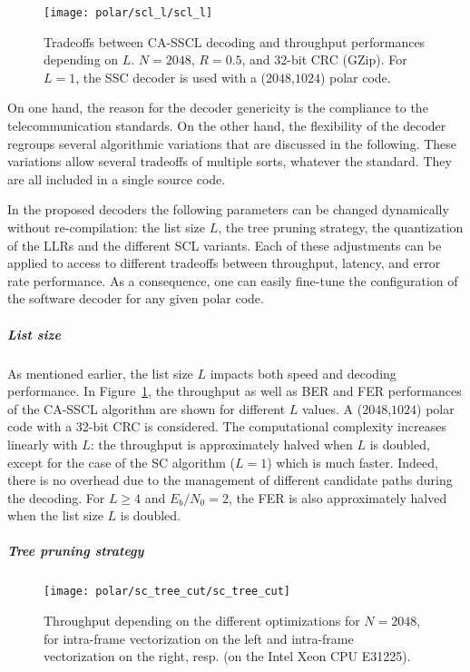 \begin{figure}
  \centering
  \texttt{[image: polar/scl\_l/scl\_l]}
  \caption{Tradeoffs between CA-SSCL decoding and throughput performances
    depending on $L$. $N=2048$, $R=0.5$, and 32-bit CRC (GZip). For $L=1$, the
    SSC decoder is used with a ($2048$,$1024$) polar code.}
  \label{plot:polar_scl_l}
\end{figure}

On one hand, the reason for the decoder genericity is the compliance to the
telecommunication standards. On the other hand, the flexibility of the decoder
regroups several algorithmic variations that are discussed in the following.
These variations allow several tradeoffs of multiple sorts, whatever the
standard. They are all included in a single source code.

In the proposed decoders the following parameters can be changed dynamically
without re-compilation: the list size $L$, the tree pruning strategy, the
quantization of the LLRs and the different SCL variants. Each of these
adjustments can be applied to access to different tradeoffs between throughput,
latency, and error rate performance. As a consequence, one can easily fine-tune
the configuration of the software decoder for any given polar code.

\subparagraph{List size}

As mentioned earlier, the list size $L$ impacts both speed and decoding
performance. In Figure~\ref{plot:polar_scl_l}, the throughput as well as BER and
FER performances of the CA-SSCL algorithm are shown for different $L$ values. A
($2048$,$1024$) polar code with a 32-bit CRC is considered. The computational
complexity increases linearly with $L$: the throughput is approximately halved
when $L$ is doubled, except for the case of the SC algorithm ($L=1$) which is
much faster. Indeed, there is no overhead due to the management of different
candidate paths during the decoding. For $L\geq4$ and $E_b/N_0=2$, the FER is
also approximately halved when the list size $L$ is doubled.

\subparagraph{Tree pruning strategy}

\begin{figure}[htp]
\texttt{[image: polar/sc\_tree\_cut/sc\_tree\_cut]}
\caption{Throughput depending on the different optimizations for $N = 2048$, for
  intra-frame vectorization on the left and intra-frame vectorization on the
  right, resp. (on the Intel Xeon CPU E31225).}
\label{plot:polar_sc_tree_cut}
\end{figure}

